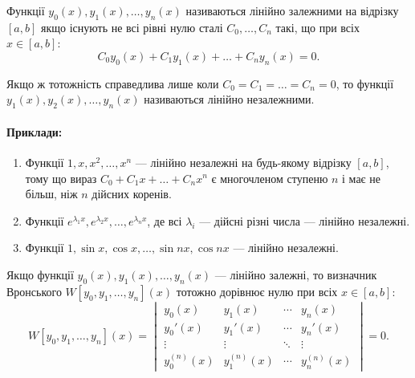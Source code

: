 \begin{definition}
	Функції $y_0(x), y_1(x), \ldots, y_n(x)$ називаються лінійно залежними на відрізку $[a,b]$ якщо існують не всі рівні нулю сталі $C_0, \ldots, C_n$ такі, що при всіх $x \in [a,b]$: 
	\begin{equation*}
		C_0 y_0(x) + C_1 y_1(x) + \ldots + C_n y_n(x) = 0.
	\end{equation*}

	Якщо ж тотожність справедлива лише коли $C_0 = C_1 = \ldots = C_n = 0$, то функції $y_1(x), y_2(x), \ldots, y_n(x)$ називаються лінійно незалежними.
\end{definition}

\paragraph{Приклади:}

\begin{enumerate}
	\item Функції $1, x, x^2, \ldots, x^n$ --- лінійно незалежні на будь-якому відрізку $[a,b]$, тому що вираз $C_0 + C_1 x + \ldots + C_n x^n$ є многочленом ступеню $n$ і має не більш, ніж $n$ дійсних коренів.
	
	\item Функції $e^{\lambda_1 x}, e^{\lambda_2 x}, \ldots, e^{\lambda_n x}$, де всі $\lambda_i$ --- дійсні різні числа --- лінійно незалежні. 
	
	\item Функції $1, \sin x, \cos x, \ldots, \sin nx, \cos nx$ --- лінійно незалежні.
\end{enumerate}

\begin{theorem}
	Якщо функції $y_0(x), y_1(x), \ldots, y_n(x)$ --- лінійно залежні, то визначник Вронського $W[y_0, y_1, \ldots, y_n](x)$ тотожно дорівнює нулю при всіх $x \in [a,b]$:
	\begin{equation*}
		W[y_0, y_1, \ldots, y_n](x) = \begin{vmatrix} y_0(x) & y_1(x) & \cdots & y_n(x) \\ y_0'(x) & y_1'(x) & \cdots & y_n'(x) \\ \vdots & \vdots & \ddots & \vdots \\ y_0^{(n)}(x) & y_1^{(n)}(x) & \cdots & y_n^{(n)}(x) \end{vmatrix} = 0.
	\end{equation*}
\end{theorem}

